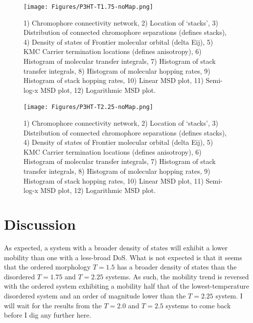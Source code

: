 \documentclass[12pt]{article}
\begin{document}
\begin{figure}[h]\centering
	\texttt{[image: Figures/P3HT-T1.75-noMap.png]}
    \caption{   1) Chromophore connectivity network, 
                2) Location of `stacks', 
                3) Distribution of connected chromophore separations (defines stacks),
                4) Density of states of Frontier molecular orbital (delta Eij),
                5) KMC Carrier termination locations (defines anisotropy),
                6) Histogram of molecular transfer integrals,
                7) Histogram of stack transfer integrals,
                8) Histogram of molecular hopping rates,
                9) Histogram of stack hopping rates,
                10) Linear MSD plot,
                11) Semi-log-x MSD plot,
                12) Logarithmic MSD plot.}
	\label{fig:T1.75}
\end{figure}



\begin{figure}[h]\centering
	\texttt{[image: Figures/P3HT-T2.25-noMap.png]}
    \caption{   1) Chromophore connectivity network, 
                2) Location of `stacks', 
                3) Distribution of connected chromophore separations (defines stacks),
                4) Density of states of Frontier molecular orbital (delta Eij),
                5) KMC Carrier termination locations (defines anisotropy),
                6) Histogram of molecular transfer integrals,
                7) Histogram of stack transfer integrals,
                8) Histogram of molecular hopping rates,
                9) Histogram of stack hopping rates,
                10) Linear MSD plot,
                11) Semi-log-x MSD plot,
                12) Logarithmic MSD plot.}
	\label{fig:T2.25}
\end{figure}


\newpage

\section{Discussion}

As expected, a system with a broader density of states will exhibit a lower mobility than one with a less-broad DoS.
What is not expected is that it seems that the ordered morphology $T = 1.5$ has a broader density of states than the disordered $T = 1.75$ and $T = 2.25$ systems.
As such, the mobility trend is reversed with the ordered system exhibiting a mobility half that of the lowest-temperature disordered system and an order of magnitude lower than the $T = 2.25$ system.
I will wait for the results from the $T = 2.0$ and $T = 2.5$ systems to come back before I dig any further here.
\end{document}
